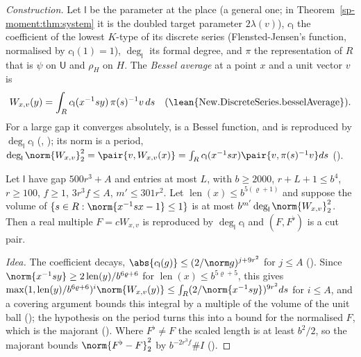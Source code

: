 \emph{Construction.} Let $\mathsf l$ be the parameter at the place (a general one; in
Theorem~\ref{sp-moment:thm:system} it is the doubled target parameter $2\lambda(v)$), $c_{\mathsf l}$ the coefficient of the
lowest $K$-type of its discrete series (Flensted-Jensen's function, normalised by $c_{\mathsf l}(1)=1$),
$\deg_{\mathsf l}$ its formal degree, and $\pi$ the representation of $R$ that is $\psi$ on $\mathsf U$
and $\rho_H$ on $H$. The \emph{Bessel average} at a point $x$ and a unit vector $v$ is
\[
W_{x,v}(y)=\int_Rc_{\mathsf l}(x^{-1}sy)\,\pi(s)^{-1}v\,ds
\quad(\text{\lean{New.DiscreteSeries.besselAverage}}).
\]
For a large gap it converges absolutely, is a Bessel function, and is reproduced by
$\deg_{\mathsf l} c_{\mathsf l}$ (,
); its norm is a period,
$\deg_{\mathsf l}\norm{W_{x,v}}_2^2=\pair{v,W_{x,v}(x)}=\int_Rc_{\mathsf l}(x^{-1}sx)\pair{v,\pi(s)^{-1}v}ds$
().

\begin{proposition}
\label{sp-moment:prop:cut}
Let $\mathsf l$ have gap $500r^3+A$ and entries at most $L$, with $b\ge2000$, $r+L+1\le b^4$,
$r\ge100$, $f\ge1$, $3r^3f\le A$, $m'\le301r^2$. Let $\operatorname{len}(x)\le b^{5(\varrho+1)}$ and suppose the volume
of $\{s\in R:\norm{x^{-1}sx-1}\le1\}$ is at most $b^{m'}\deg_{\mathsf l}\norm{W_{x,v}}_2^2$. Then a real
multiple $F=cW_{x,v}$ is reproduced by $\deg_{\mathsf l} c_{\mathsf l}$ and $(F,F^\flat)$ is a cut pair.
\end{proposition}

\begin{proof}[Idea]
The coefficient decays, $\abs{c_{\mathsf l}(g)}\le(2/\norm g)^{j+9r^2}$ for $j\le A$
(). Since $\norm{x^{-1}sy}\ge2\operatorname{len}(y)/b^{6\varrho+6}$
for $\operatorname{len}(x)\le b^{5\varrho+5}$, this gives $\max(1,\operatorname{len}(y)/b^{6\varrho+6})^i\norm{W_{x,v}(y)}\le
\int_R(2/\norm{x^{-1}sy})^{9r^2}ds$ for $i\le A$, and a covering argument bounds this integral by
a multiple of the volume of the unit ball
(); the hypothesis on the period turns
this into a bound for the normalised $F$, which is the majorant
(). Where $F^\flat\ne F$ the scaled length is at
least $b^2/2$, so the majorant bounds $\norm{F^\flat-F}_2^2$ by $b^{-2r^3f}\#I$
().
\end{proof}


